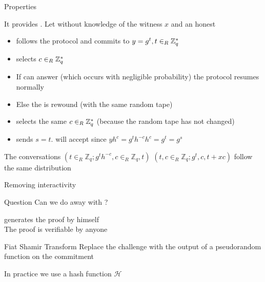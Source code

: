 \documentclass[handouts]{beamer}
\begin{document}
\begin{frame}[allowframebreaks]{Properties}
\framebreak

It provides . Let  \siml without knowledge of the witness $x$ and an honest \ver 
 
\begin{itemize}
\item \siml follows the protocol and commits to $y=g^t, t \in_R \mathbb{Z}^*_{q}$  
\item \ver selects $c \in_R \mathbb{Z}^*_{q}$  
\item If \siml can answer (which occurs with negligible probability) the protocol resumes normally    
\item Else the \ver is rewound (with the same random tape)    
\item \ver selects the same $c \in_R \mathbb{Z}^*_{q}$ (because the random tape has not changed)   
\item \siml sends $s=t$. \ver will accept since $yh^{c} = g^t  h^{-c} h^{c} = g^t = g^s$  
\end{itemize}
  
The conversations $(t \in_R \mathbb{Z}_q; g^t h^{-c}   , c \in_R \mathbb{Z}_q  , t )$ 
$(t,c \in_R \mathbb{Z}_q;  g^t  , c  , t+xc  )$
 follow the same distribution
\end{frame}
 

\begin{frame}{Removing interactivity}
\begin{block}{Question}
Can we do away with \ver?
\end{block}
\pause
\prv generates the proof by himself \\
\pause
The proof is verifiable by anyone
\pause
\begin{block}{Fiat Shamir Transform}
Replace the challenge with the output of a pseudorandom function on the commitment

In practice we use a hash function $\mathcal{H}$
\end{block}
\end{frame}
\end{document}
